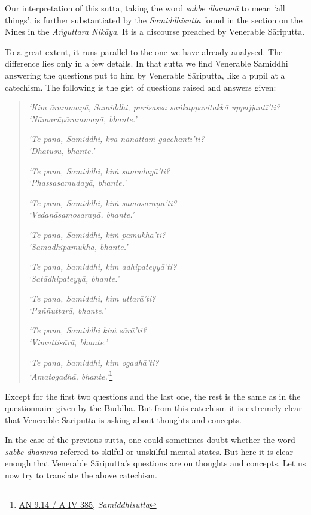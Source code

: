 Our interpretation of this sutta, taking the word \emph{sabbe dhammā} to mean `all things', is further substantiated by the \emph{Samiddhisutta} found in the section on the Nines in the \emph{Aṅguttara Nikāya}. It is a discourse preached by Venerable Sāriputta.

To a great extent, it runs parallel to the one we have already analysed. The difference lies only in a few details. In that sutta we find Venerable Samiddhi answering the questions put to him by Venerable Sāriputta, like a pupil at a catechism. The following is the gist of questions raised and answers given:

\begin{quote}
\emph{`Kim ārammaṇā, Samiddhi, purisassa saṅkappavitakkā uppajjantī'ti?}\\
\emph{`Nāmarūpārammaṇā, bhante.'}

\emph{`Te pana, Samiddhi, kva nānattaṁ gacchantī'ti?}\\
\emph{`Dhātūsu, bhante.'}

\emph{`Te pana, Samiddhi, kiṁ samudayā'ti?}\\
\emph{`Phassasamudayā, bhante.'}

\emph{`Te pana, Samiddhi, kiṁ samosaraṇā'ti?}\\
\emph{`Vedanāsamosaraṇā, bhante.'}

\emph{`Te pana, Samiddhi, kiṁ pamukhā'ti?}\\
\emph{`Samādhipamukhā, bhante.'}

\emph{`Te pana, Samiddhi, kim adhipateyyā'ti?}\\
\emph{`Satādhipateyyā, bhante.'}

\emph{`Te pana, Samiddhi, kim uttarā'ti?}\\
\emph{`Paññuttarā, bhante.'}

\emph{`Te pana, Samiddhi kiṁ sārā'ti?}\\
\emph{`Vimuttisārā, bhante.'}

\emph{`Te pana, Samiddhi, kim ogadhā'ti?}\\
\emph{`Amatogadhā, bhante.'}\footnote{\href{https://suttacentral.net/an9.14/pli/ms}{AN 9.14 / A IV 385}, \emph{Samiddhisutta}}
\end{quote}

Except for the first two questions and the last one, the rest is the same as in the questionnaire given by the Buddha. But from this catechism it is extremely clear that Venerable Sāriputta is asking about thoughts and concepts.

In the case of the previous sutta, one could sometimes doubt whether the word \emph{sabbe dhammā} referred to skilful or unskilful mental states. But here it is clear enough that Venerable Sāriputta's questions are on thoughts and concepts. Let us now try to translate the above catechism.

